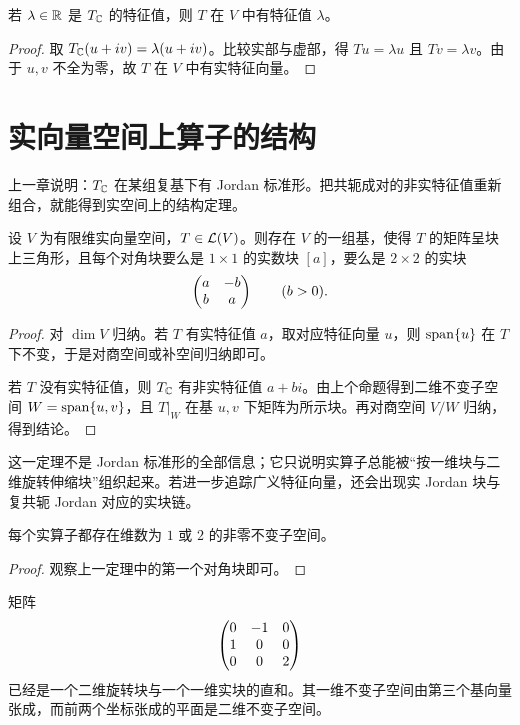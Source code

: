 \begin{proposition}
若 $\lambda\in\mathbb{R}$ 是 $T_{\mathbb{C}}$ 的特征值，则 $T$ 在 $V$ 中有特征值 $\lambda$。
\end{proposition}

\begin{proof}
取 $T_{\mathbb{C}}(u+iv)=\lambda(u+iv)$。比较实部与虚部，得 $Tu=\lambda u$ 且 $Tv=\lambda v$。由于 $u,v$ 不全为零，故 $T$ 在 $V$ 中有实特征向量。
\end{proof}

\section{实向量空间上算子的结构}

上一章说明：$T_{\mathbb{C}}$ 在某组复基下有 Jordan 标准形。把共轭成对的非实特征值重新组合，就能得到实空间上的结构定理。

\begin{theorem}[实块上三角形]
设 $V$ 为有限维实向量空间，$T\in\mathcal{L}(V)$。则存在 $V$ 的一组基，使得 $T$ 的矩阵呈块上三角形，且每个对角块要么是 $1\times1$ 的实数块 $[a]$，要么是 $2\times2$ 的实块
\[
\begin{pmatrix} a&-b\\b&a \end{pmatrix}\qquad(b>0).
\]
\end{theorem}

\begin{proof}
对 $\dim V$ 归纳。若 $T$ 有实特征值 $a$，取对应特征向量 $u$，则 $\operatorname{span}\{u\}$ 在 $T$ 下不变，于是对商空间或补空间归纳即可。

若 $T$ 没有实特征值，则 $T_{\mathbb{C}}$ 有非实特征值 $a+bi$。由上个命题得到二维不变子空间 $W=\operatorname{span}\{u,v\}$，且 $T|_W$ 在基 $u,v$ 下矩阵为所示块。再对商空间 $V/W$ 归纳，得到结论。
\end{proof}

\begin{remark}
这一定理不是 Jordan 标准形的全部信息；它只说明实算子总能被“按一维块与二维旋转伸缩块”组织起来。若进一步追踪广义特征向量，还会出现实 Jordan 块与复共轭 Jordan 对应的实块链。
\end{remark}

\begin{corollary}
每个实算子都存在维数为 $1$ 或 $2$ 的非零不变子空间。
\end{corollary}

\begin{proof}
观察上一定理中的第一个对角块即可。
\end{proof}

\begin{example}
矩阵
\[
\begin{pmatrix} 0&-1&0\\1&0&0\\0&0&2 \end{pmatrix}
\]
已经是一个二维旋转块与一个一维实块的直和。其一维不变子空间由第三个基向量张成，而前两个坐标张成的平面是二维不变子空间。
\end{example}

